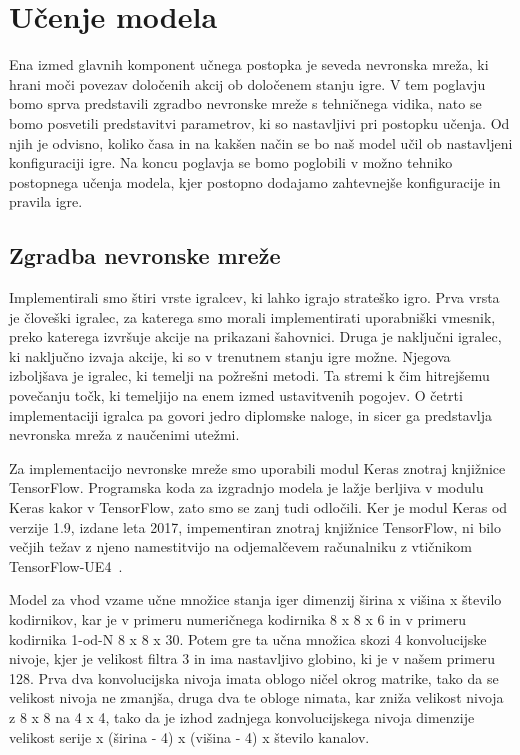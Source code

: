 \documentclass[a4paper, 12pt]{book}
\begin{document}
{\chapter{Učenje modela}
\label{chucenjemodela}
Ena izmed glavnih komponent učnega postopka je seveda nevronska mreža, ki hrani moči povezav določenih akcij ob določenem stanju igre.
V tem poglavju bomo sprva predstavili zgradbo nevronske mreže s tehničnega vidika, nato se bomo posvetili predstavitvi parametrov, ki so nastavljivi pri postopku učenja.
Od njih je odvisno, koliko časa in na kakšen način se bo naš model učil ob nastavljeni konfiguraciji igre.
Na koncu poglavja se bomo poglobili v možno tehniko postopnega učenja modela, kjer postopno dodajamo zahtevnejše konfiguracije in pravila igre.

\section{Zgradba nevronske mreže}
Implementirali smo štiri vrste igralcev, ki lahko igrajo strateško igro.
Prva vrsta je človeški igralec, za katerega smo morali implementirati uporabniški vmesnik, preko katerega izvršuje akcije na prikazani šahovnici.
Druga je naključni igralec, ki naključno izvaja akcije, ki so v trenutnem stanju igre možne.
Njegova izboljšava je igralec, ki temelji na požrešni metodi.
Ta stremi k čim hitrejšemu povečanju točk, ki temeljijo na enem izmed ustavitvenih pogojev.
O četrti implementaciji igralca pa govori jedro diplomske naloge, in sicer ga predstavlja nevronska mreža z naučenimi utežmi.

Za implementacijo nevronske mreže smo uporabili modul Keras znotraj knjižnice TensorFlow.
Programska koda za izgradnjo modela je lažje berljiva v modulu Keras kakor v TensorFlow, zato smo se zanj tudi odločili.
Ker je modul Keras od verzije 1.9, izdane leta 2017, impementiran znotraj knjižnice TensorFlow, ni bilo večjih težav z njeno namestitvijo na odjemalčevem računalniku z vtičnikom TensorFlow-UE4~\cite{ue4tf}.

Model za vhod vzame učne množice stanja iger dimenzij širina x višina x število kodirnikov, kar je v primeru numeričnega kodirnika 8 x 8 x 6 in v primeru kodirnika 1-od-N 8 x 8 x 30.
Potem gre ta učna množica skozi 4 konvolucijske nivoje, kjer je velikost filtra 3 in ima nastavljivo globino, ki je v našem primeru 128.
Prva dva konvolucijska nivoja imata oblogo ničel okrog matrike, tako da se velikost nivoja ne zmanjša, druga dva te obloge nimata, kar zniža velikost nivoja z 8 x 8 na 4 x 4, tako da je izhod zadnjega konvolucijskega nivoja dimenzije velikost serije x (širina - 4) x (višina - 4) x število kanalov.

}
\end{document}
